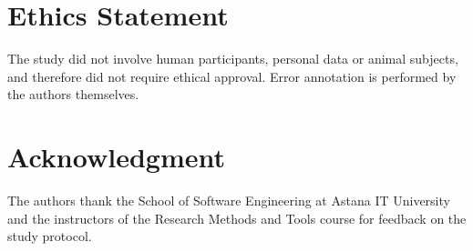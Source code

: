 \section*{Ethics Statement}
The study did not involve human participants, personal data or animal subjects, and therefore did not require ethical approval. Error annotation is performed by the authors themselves.

\section*{Acknowledgment}
The authors thank the School of Software Engineering at Astana IT University and the instructors of the Research Methods and Tools course for feedback on the study protocol.
